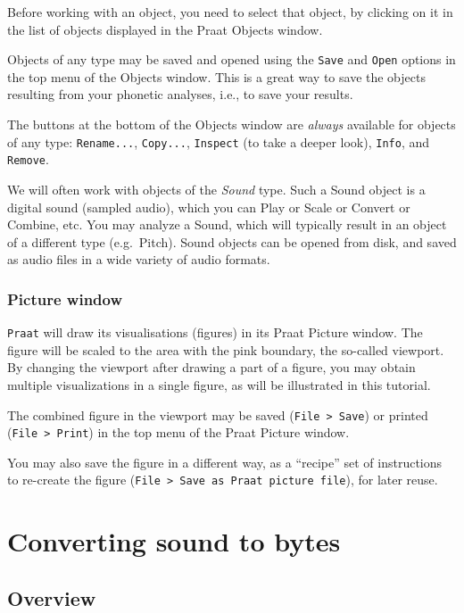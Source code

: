 \documentclass[
]{book}
\begin{document}
Before working with an object, you need to select that object, by clicking on it in the list of objects displayed in the Praat Objects window.

Objects of any type may be saved and opened using the \texttt{Save} and \texttt{Open} options in the top menu of the Objects window. This is a great way to save the objects resulting from your phonetic analyses, i.e., to save your results.

The buttons at the bottom of the Objects window are \emph{always} available for objects of any type: \texttt{Rename...}, \texttt{Copy...}, \texttt{Inspect} (to take a deeper look), \texttt{Info}, and \texttt{Remove}.

We will often work with objects of the \emph{Sound} type. Such a Sound object is a digital sound (sampled audio), which you can Play or Scale or Convert or Combine, etc. You may analyze a Sound, which will typically result in an object of a different type (e.g.~Pitch). Sound objects can be opened from disk, and saved as audio files in a wide variety of audio formats.

\subsection*{Picture window}\label{picture-window}

\texttt{Praat} will draw its visualisations (figures) in its Praat Picture window. The figure will be scaled to the area with the pink boundary, the so-called viewport. By changing the viewport after drawing a part of a figure, you may obtain multiple visualizations in a single figure, as will be illustrated in this tutorial.

The combined figure in the viewport may be saved (\texttt{File\ \textgreater{}\ Save}) or printed (\texttt{File\ \textgreater{}\ Print}) in the top menu of the Praat Picture window.

You may also save the figure in a different way, as a ``recipe'' set of instructions to re-create the figure (\texttt{File\ \textgreater{}\ Save\ as\ Praat\ picture\ file}), for later reuse.

\chapter{Converting sound to bytes}\label{converting-sound-to-bytes}

\section{Overview}\label{sec:ADCoverview}
\end{document}

